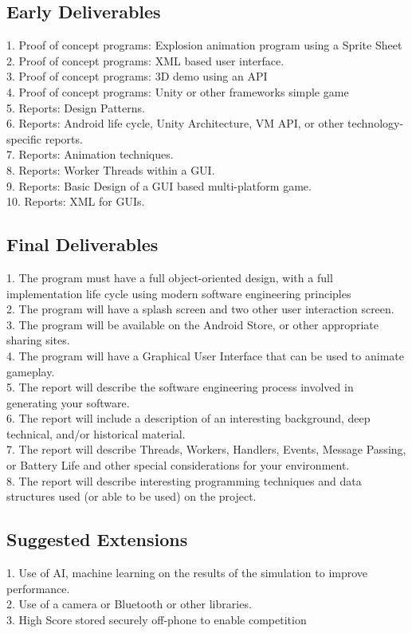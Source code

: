 \documentclass[a4paper]{report}
\begin{document}
\subsection*{Early Deliverables}
1. Proof of concept programs: Explosion animation program using a Sprite Sheet \\
2. Proof of concept programs: XML based user interface.\\
3. Proof of concept programs: 3D demo using an API\\
4. Proof of concept programs: Unity or other frameworks simple game\\
5. Reports: Design Patterns.\\
6. Reports: Android life cycle, Unity Architecture, VM API, or other technology-specific reports.\\
7. Reports: Animation techniques.\\
8. Reports: Worker Threads within a GUI.\\
9. Reports: Basic Design of a GUI based multi-platform game.\\
10. Reports: XML for GUIs.
\pagebreak
\subsection*{Final Deliverables}
1. The program must have a full object-oriented design, with a full implementation life cycle using modern software engineering principles\\
2. The program will have a splash screen and two other user interaction screen.\\
3. The program will be available on the Android Store, or other appropriate sharing sites.\\
4. The program will have a Graphical User Interface that can be used to animate gameplay.\\
5. The report will describe the software engineering process involved in generating your software.\\
6. The report will include a description of an interesting background, deep technical, and/or historical material.\\
7. The report will describe Threads, Workers, Handlers, Events, Message Passing, or Battery Life and other special considerations for your environment.\\
8. The report will describe interesting programming techniques and data structures used (or able to be used) on the project.
\subsection*{Suggested Extensions}
1. Use of AI, machine learning on the results of the simulation to improve performance.\\
2. Use of a camera or Bluetooth or other libraries.\\
3. High Score stored securely off-phone to enable competition\\
\end{document}
